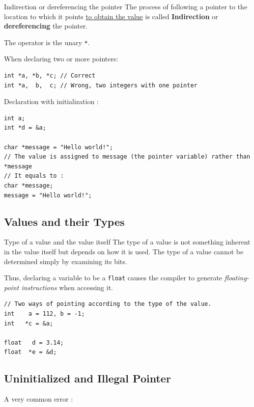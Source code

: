 \begin{Definition}[colbacktitle=red!75!black]{Indirection or dereferencing the pointer}{}
The process of following a pointer to the location  to which it points \underline{to obtain the value} is called \textbf{Indirection} or \textbf{dereferencing} the pointer. 

The operator is the unary \verb|*|. 
\end{Definition}



When declaring two or more pointers:
\begin{lstlisting}
int *a, *b, *c; // Correct 
int *a,  b,  c; // Wrong, two integers with one pointer
\end{lstlisting}

Declaration with initialization :
\begin{lstlisting}
int a; 
int *d = &a; 

char *message = "Hello world!";
// The value is assigned to message (the pointer variable) rather than *message
// It equals to : 
char *message; 
message = "Hello world!";
\end{lstlisting}

\subsection{Values and their Types} %
\label{sec:Values and their Types}

\begin{Prop}{Type of a value and the value itself}{}
The type of a value is not something inherent in the value itself but depends on how it is used. The type of a value cannot be determined simply by examining its bits. 
\end{Prop}



Thus, declaring a variable to be a \verb|float| causes the compiler to generate \textit{floating-point instructions} when accessing it. 

\begin{lstlisting}
// Two ways of pointing according to the type of the value.
int    a = 112, b = -1;
int   *c = &a;

float   d = 3.14;
float  *e = &d;
\end{lstlisting}


\subsection{Uninitialized and Illegal Pointer} %
\label{sub:Uninitialized and Illegal Pointer}
A very common error :

